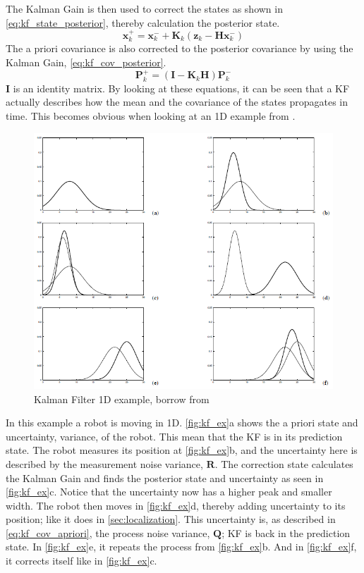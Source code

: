 \documentclass[Main]{subfiles}
\begin{document}
The Kalman Gain is then used to correct the states as shown in \autoref{eq:kf_state_posterior}, thereby calculation the posterior state. 
\begin{equation}
\label{eq:kf_state_posterior}
\mathbf{x}_k^+ = \mathbf{x}_k^- + \mathbf{K}_k (\mathbf{z}_k - \mathbf{H} \mathbf{x}_k^-)
\end{equation}
The a priori covariance is also corrected to the posterior covariance by using the Kalman Gain, \autoref{eq:kf_cov_posterior}.
\begin{equation}
\label{eq:kf_cov_posterior}
\mathbf{P}_k^+ = (\mathbf{I} - \mathbf{K}_k \mathbf{H}) \mathbf{P}_k^-
\end{equation}
$\mathbf{I}$ is an identity matrix.
By looking at these equations, it can be seen that a KF actually describes how the mean and the covariance of the states propagates in time.
This becomes obvious when looking at an 1D example from \citep{Thrun2002}.
\begin{figure}[H]
	\centering
	\includegraphics[width=0.8\linewidth]{./Figures/kf_ex.png}
	\caption{Kalman Filter 1D example, borrow from \citep{Thrun2002}}
	\label{fig:kf_ex}
\end{figure}\noindent
In this example a robot is moving in 1D.
\autoref{fig:kf_ex}a shows the a priori state and uncertainty, variance, of the robot.
This mean that the KF is in its prediction state.
The robot measures its position at \autoref{fig:kf_ex}b, and the uncertainty here is described by the measurement noise variance, $\mathbf{R}$.
The correction state calculates the Kalman Gain and finds the posterior state and uncertainty as seen in \autoref{fig:kf_ex}c.
Notice that the uncertainty now has a higher peak and smaller width.
The robot then moves in \autoref{fig:kf_ex}d, thereby adding uncertainty to its position; like it does in \autoref{sec:localization}.
This uncertainty is, as described in \autoref{eq:kf_cov_apriori}, the process noise variance, $\mathbf{Q}$; KF is back in the prediction state.
In \autoref{fig:kf_ex}e, it repeats the process from \autoref{fig:kf_ex}b.
And in \autoref{fig:kf_ex}f, it corrects itself like in \autoref{fig:kf_ex}c.
\end{document}
